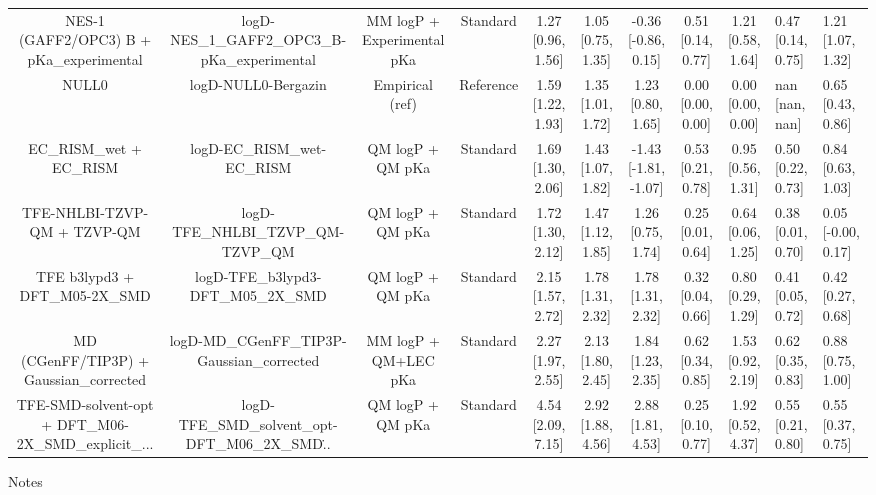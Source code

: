 \documentclass{article}
\begin{document}
\begin{center}
\begin{longtable}{|ccccccccc|}
           NES-1 (GAFF2/OPC3) B + pKa_experimental &      logD-NES\_1\_GAFF2\_OPC3\_B-pKa\_experimental &         MM logP + Experimental pKa &   Standard &  1.27 [0.96, 1.56] &  1.05 [0.75, 1.35] &   -0.36 [-0.86, 0.15] &  0.51 [0.14, 0.77] &  1.21 [0.58, 1.64] &   0.47 [0.14, 0.75] &   1.21 [1.07, 1.32] \\
                                             NULL0 &                                logD-NULL0-Bergazin &                    Empirical (ref) &  Reference &  1.59 [1.22, 1.93] &  1.35 [1.01, 1.72] &     1.23 [0.80, 1.65] &  0.00 [0.00, 0.00] &  0.00 [0.00, 0.00] &      nan [nan, nan] &   0.65 [0.43, 0.86] \\
                             EC_RISM_wet + EC_RISM &                        logD-EC\_RISM\_wet-EC\_RISM &                   QM logP + QM pKa &   Standard &  1.69 [1.30, 2.06] &  1.43 [1.07, 1.82] &  -1.43 [-1.81, -1.07] &  0.53 [0.21, 0.78] &  0.95 [0.56, 1.31] &   0.50 [0.22, 0.73] &   0.84 [0.63, 1.03] \\
                       TFE-NHLBI-TZVP-QM + TZVP-QM &                 logD-TFE\_NHLBI\_TZVP\_QM-TZVP\_QM &                   QM logP + QM pKa &   Standard &  1.72 [1.30, 2.12] &  1.47 [1.12, 1.85] &     1.26 [0.75, 1.74] &  0.25 [0.01, 0.64] &  0.64 [0.06, 1.25] &   0.38 [0.01, 0.70] &  0.05 [-0.00, 0.17] \\
                      TFE b3lypd3 + DFT_M05-2X_SMD &                logD-TFE\_b3lypd3-DFT\_M05\_2X\_SMD &                   QM logP + QM pKa &   Standard &  2.15 [1.57, 2.72] &  1.78 [1.31, 2.32] &     1.78 [1.31, 2.32] &  0.32 [0.04, 0.66] &  0.80 [0.29, 1.29] &   0.41 [0.05, 0.72] &   0.42 [0.27, 0.68] \\
            MD (CGenFF/TIP3P) + Gaussian_corrected &         logD-MD\_CGenFF\_TIP3P-Gaussian\_corrected &               MM logP + QM+LEC pKa &   Standard &  2.27 [1.97, 2.55] &  2.13 [1.80, 2.45] &     1.84 [1.23, 2.35] &  0.62 [0.34, 0.85] &  1.53 [0.92, 2.19] &   0.62 [0.35, 0.83] &   0.88 [0.75, 1.00] \\
 TFE-SMD-solvent-opt + DFT_M06-2X_SMD_explicit_... &  logD-TFE\_SMD\_solvent\_opt-DFT\_M06\_2X\_SMD\... &                   QM logP + QM pKa &   Standard &  4.54 [2.09, 7.15] &  2.92 [1.88, 4.56] &     2.88 [1.81, 4.53] &  0.25 [0.10, 0.77] &  1.92 [0.52, 4.37] &   0.55 [0.21, 0.80] &   0.55 [0.37, 0.75] \\
\end{longtable}
\end{center}

Notes
\end{document}
